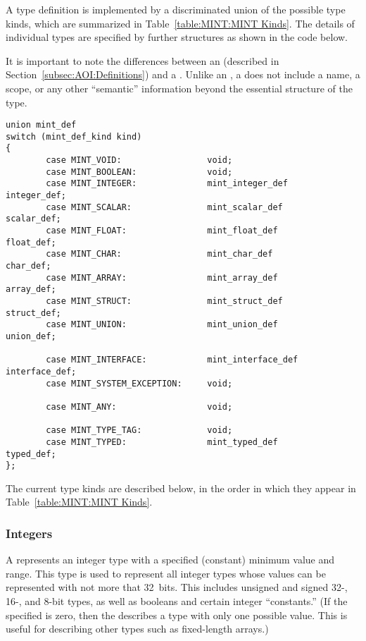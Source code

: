 A \MINT{} type definition is implemented by a discriminated union of the
possible type kinds, which are summarized in Table~\ref{table:MINT:MINT Kinds}.
The details of individual \MINT{} types are specified by further \MINT{}
structures as shown in the code below.

It is important to note the differences between an  (described in
Section~\ref{subsec:AOI:Definitions}) and a .  Unlike an
, a  does not include a name, a scope, or any other
``semantic'' information beyond the essential structure of the type.

\begin{verbatim}
union mint_def
switch (mint_def_kind kind)
{
        case MINT_VOID:                 void;
        case MINT_BOOLEAN:              void;
        case MINT_INTEGER:              mint_integer_def        integer_def;
        case MINT_SCALAR:               mint_scalar_def         scalar_def;
        case MINT_FLOAT:                mint_float_def          float_def;
        case MINT_CHAR:                 mint_char_def           char_def;
        case MINT_ARRAY:                mint_array_def          array_def;
        case MINT_STRUCT:               mint_struct_def         struct_def;
        case MINT_UNION:                mint_union_def          union_def;

        case MINT_INTERFACE:            mint_interface_def      interface_def;
        case MINT_SYSTEM_EXCEPTION:     void;

        case MINT_ANY:                  void;

        case MINT_TYPE_TAG:             void;
        case MINT_TYPED:                mint_typed_def          typed_def;
};
\end{verbatim}

The current \MINT{} type kinds are described below, in the order in which they
appear in Table~\ref{table:MINT:MINT Kinds}.


\subsubsection{Integers}

A  represents an integer type with a specified (constant)
minimum value and range.  This type is used to represent all integer types
whose values can be represented with not more that 32~bits.  This includes
unsigned and signed \mbox{32-,} \mbox{16-,} and 8-bit types, as well as
booleans and certain integer ``constants.''  (If the specified  is
zero, then the  describes a type with only one possible
value.  This is useful for describing other types such as fixed-length arrays.)

